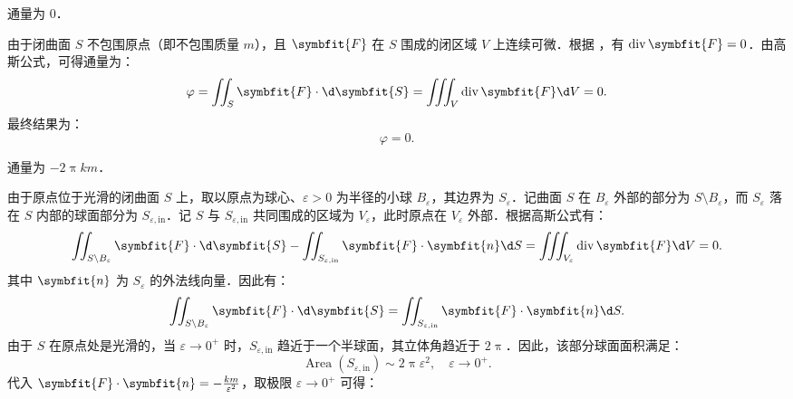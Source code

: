 \begin{solution}
     通量为 $0$．

    由于闭曲面 $S$ 不包围原点（即不包围质量 $m$），且 $\symbfit{F}$ 在 $S$ 围成的闭区域 $V$ 上连续可微．根据 ，有 $\operatorname{div} \symbfit{F} = 0$．由高斯公式，可得通量为：
    \begin{equation}
        \label{eq:gauss-2}
        \varphi = \iint_S \symbfit{F} \cdot \d \symbfit{S} = \iiint_V \operatorname{div} \symbfit{F} \d V = 0.
    \end{equation}
    最终结果为：
    \begin{equation}
        \label{eq:final-ans-2}
        \varphi = \boxed{0}.
    \end{equation}

     通量为 $-2\uppi km$．

    由于原点位于光滑的闭曲面 $S$ 上，取以原点为球心、$\varepsilon > 0$ 为半径的小球 $B_\varepsilon$，其边界为 $S_\varepsilon$．记曲面 $S$ 在 $B_\varepsilon$ 外部的部分为 $S \setminus B_\varepsilon$，而 $S_\varepsilon$ 落在 $S$ 内部的球面部分为 $S_{\varepsilon, \text{in}}$．记 $S$ 与 $S_{\varepsilon, \text{in}}$ 共同围成的区域为 $V_\varepsilon$，此时原点在 $V_\varepsilon$ 外部．根据高斯公式有：
    \begin{equation}
        \label{eq:gauss-3}
        \iint_{S \setminus B_\varepsilon} \symbfit{F} \cdot \d \symbfit{S} - \iint_{S_{\varepsilon, \text{in}}} \symbfit{F} \cdot \symbfit{n} \d S = \iiint_{V_\varepsilon} \operatorname{div} \symbfit{F} \d V = 0.
    \end{equation}
    其中 $\symbfit{n}$ 为 $S_\varepsilon$ 的外法线向量．因此有：
    \begin{equation}
        \label{eq:relation-3}
        \iint_{S \setminus B_\varepsilon} \symbfit{F} \cdot \d \symbfit{S} = \iint_{S_{\varepsilon, \text{in}}} \symbfit{F} \cdot \symbfit{n} \d S.
    \end{equation}
    由于 $S$ 在原点处是光滑的，当 $\varepsilon \to 0^+$ 时，$S_{\varepsilon, \text{in}}$ 趋近于一个半球面，其立体角趋近于 $2\uppi$．因此，该部分球面面积满足：
    \begin{equation}
        \label{eq:area-3}
        \operatorname{Area}(S_{\varepsilon, \text{in}}) \sim 2\uppi \varepsilon^2,
        \quad \varepsilon \to 0^+.
    \end{equation}
    代入 $\symbfit{F} \cdot \symbfit{n} = -\frac{km}{\varepsilon^2}$，取极限 $\varepsilon \to 0^+$ 可得：
    \begin{equation}
        \begin{aligned}

\end{aligned}
\end{equation}
\end{solution}
